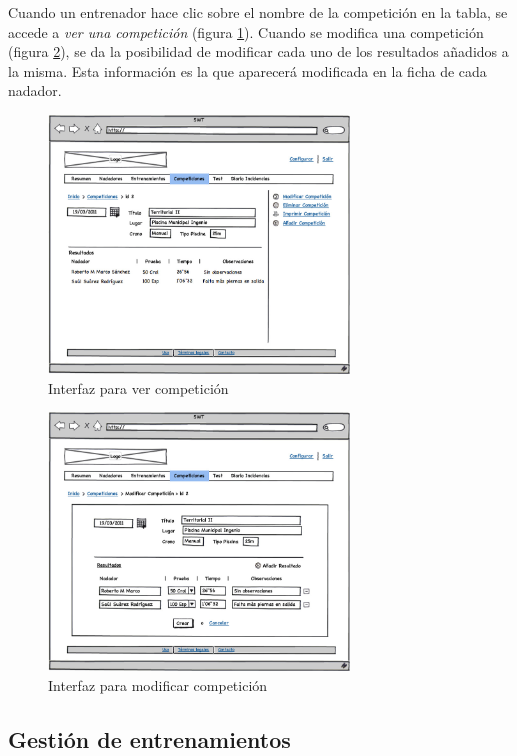   Cuando un entrenador hace clic sobre el nombre de la competición en la tabla, se accede a {\it ver una competición} (figura \ref{fig:interfaz_competiciones_show}). Cuando se modifica una competición (figura \ref{fig:interfaz_competiciones_modif}), se da la posibilidad de modificar cada uno de los resultados añadidos a la misma. Esta información es la que aparecerá modificada en la ficha de cada nadador.

  		\begin{figure}[H]
  		  \centering
  		    \includegraphics[width=8cm]{./eps/p_interfaz/16_Competiciones_show.eps}
  		  \caption{Interfaz para ver competición}
  		  \label{fig:interfaz_competiciones_show}
  		\end{figure}

  		\begin{figure}[H]
  		  \centering
  		    \includegraphics[width=8cm]{./eps/p_interfaz/17_Competiciones_modif.eps}
  		  \caption{Interfaz para modificar competición}
  		  \label{fig:interfaz_competiciones_modif}
  		\end{figure}

  	\subsection{Gestión de entrenamientos} %
  		\label{sub:gestion_de_entrenamientos}

